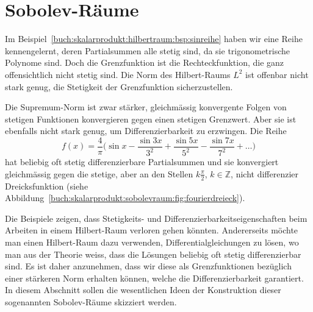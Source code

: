 %
%
%
\section{Sobolev-Räume
\label{buch:skalarprodukt:section:sobolev}}
Im Beispiel~\ref{buch:skalarprodukt:hilbertraum:bsp:sinreihe} haben 
wir eine Reihe kennengelernt, deren Partialsummen alle stetig sind,
da sie trigonometrische Polynome sind.
Doch die Grenzfunktion ist die Rechteckfunktion, die ganz offensichtlich
nicht stetig sind.
Die Norm des Hilbert-Raums $L^2$ ist offenbar nicht stark genug, die
Stetigkeit der Grenzfunktion sicherzustellen.

%
Die Supremum-Norm ist zwar stärker, gleichmässig konvergente Folgen
von stetigen Funktionen konvergieren gegen einen stetigen Grenzwert.
Aber sie ist ebenfalls nicht stark genug, um Differenzierbarkeit zu erzwingen.
Die Reihe
\begin{equation}
f(x)
=
\frac{4}{\pi}\biggl(
\sin x - \frac{\sin 3x}{3^2} + \frac{\sin 5x}{5^2} -\frac{\sin 7x}{7^2} +\dots
\biggr)
\label{buch:skalarprodukt:sobolevraum:eqn:fourierdreieck}
\end{equation}
hat beliebig oft stetig differenzierbare Partialsummen und sie konvergiert
gleichmässig gegen die stetige, aber an den Stellen $k\frac{\pi}2$,
$k\in\mathbb{Z}$, nicht differenzier Dreicksfunktion (siehe
Abbildung~\ref{buch:skalarprodukt:sobolevraum:fig:fourierdreieck}).

Die Beispiele zeigen, dass Stetigkeits- und Differenzierbarkeitseigenschaften
beim Arbeiten in einem Hilbert-Raum verloren gehen könnten.
Andererseits möchte man einen Hilbert-Raum dazu verwenden,
Differentialgleichungen zu lösen, wo man aus der Theorie weiss, dass
die Lösungen beliebig oft stetig differenzierbar sind.
Es ist daher anzunehmen, dass wir diese als Grenzfunktionen bezüglich
einer stärkeren Norm erhalten können, welche die Differenzierbarkeit
garantiert.
In diesem Abschnitt sollen die wesentlichen Ideen der Konstruktion
dieser sogenannten Sobolev-Räume skizziert werden.

%
%
